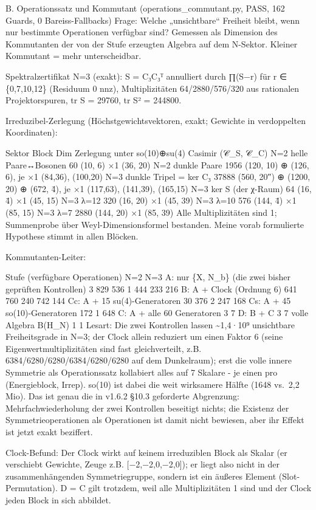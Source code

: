 B. Operationssatz und Kommutant (operations\_commutant.py, PASS, 162
Guards, 0 Bareiss-Fallbacks) Frage: Welche „unsichtbare`` Freiheit
bleibt, wenn nur bestimmte Operationen verfügbar sind? Gemessen als
Dimension des Kommutanten der von der Stufe erzeugten Algebra auf dem
N-Sektor. Kleiner Kommutant = mehr unterscheidbar.

Spektralzertifikat N=3 (exakt): S = C₃C₃ᵀ annulliert durch ∏(S−r) für r
∈ \{0,7,10,12\} (Residuum 0 nnz), Multiplizitäten 64/2880/576/320 aus
rationalen Projektorspuren, tr S = 29760, tr S² = 244800.

Irreduzibel-Zerlegung (Höchstgewichtsvektoren, exakt; Gewichte in
verdoppelten Koordinaten):

Sektor Block Dim Zerlegung unter so(10)⊕\allowbreak{}su(4) Casimir (𝒞\_S, 𝒞\_C) N=2
helle Paare↔Bosonen 60 (10, 6) ×1 (36, 20) N=2 dunkle Paare 1956 (120,
10) ⊕\allowbreak{} (126, 6), je ×1 (84,36), (100,20) N=3 dunkle Tripel = ker C₃ 37888
(560, 20″) ⊕\allowbreak{} (1200, 20) ⊕\allowbreak{} (672, 4̄), je ×1 (117,63), (141,39), (165,15)
N=3 ker S (der χ-Raum) 64 (16, 4̄) ×1 (45, 15) N=3 λ=12 320 (16, 20) ×1
(45, 39) N=3 λ=10 576 (144, 4̄) ×1 (85, 15) N=3 λ=7 2880 (144, 20) ×1
(85, 39) Alle Multiplizitäten sind 1; Summenprobe über
Weyl-Dimensionsformel bestanden. Meine vorab formulierte Hypothese
stimmt in allen Blöcken.

Kommutanten-Leiter:

Stufe (verfügbare Operationen) N=2 N=3 A: nur \{X, N\_b\} (die zwei
bisher geprüften Kontrollen) 3 829 536 1 444 233 216 B: A + Clock
(Ordnung 6) 641 760 240 742 144 Cc: A + 15 su(4)-Generatoren 30 376 2
247 168 Cs: A + 45 so(10)-Generatoren 172 1 648 C: A + alle 60
Generatoren 3 7 D: B + C 3 7 volle Algebra B(H\_N) 1 1 Lesart: Die zwei
Kontrollen lassen \textasciitilde1,4·10⁹ unsichtbare Freiheitsgrade in
N=3; der Clock allein reduziert um einen Faktor 6 (seine
Eigenwertmultiplizitäten sind fast gleichverteilt, z.B.
6384/6280/6280/6384/6280/6280 auf dem Dunkelraum); erst die volle innere
Symmetrie als Operationssatz kollabiert alles auf 7 Skalare - je einen
pro (Energieblock, Irrep). so(10) ist dabei die weit wirksamere Hälfte
(1648 vs.~2,2 Mio). Das ist genau die in v1.6.2 §10.3 geforderte
Abgrenzung: Mehrfachwiederholung der zwei Kontrollen beseitigt nichts;
die Existenz der Symmetrieoperationen als Operationen ist damit nicht
bewiesen, aber ihr Effekt ist jetzt exakt beziffert.

Clock-Befund: Der Clock wirkt auf keinem irreduziblen Block als Skalar
(er verschiebt Gewichte, Zeuge z.B. {[}−2,−2,0,−2,0{]}); er liegt also
nicht in der zusammenhängenden Symmetriegruppe, sondern ist ein äußeres
Element (Slot-Permutation). D = C gilt trotzdem, weil alle
Multiplizitäten 1 sind und der Clock jeden Block in sich abbildet.

